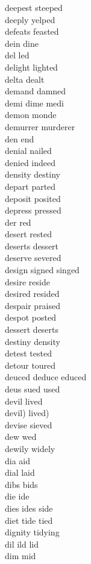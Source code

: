 deepest steeped\\
deeply yelped\\
defeats feasted\\
dein dine\\
del led\\
delight lighted\\
delta dealt\\
demand damned\\
demi dime medi\\
demon monde\\
demurrer murderer\\
den end\\
denial nailed\\
denied indeed\\
density destiny\\
depart parted\\
deposit posited\\
depress pressed\\
der red\\
desert rested\\
deserts dessert\\
deserve severed\\
design signed singed\\
desire reside\\
desired resided\\
despair praised\\
despot posted\\
dessert deserts\\
destiny density\\
detest tested\\
detour toured\\
deuced deduce educed\\
deus sued used\\
devil lived\\
devil) lived)\\
devise sieved\\
dew wed\\
dewily widely\\
dia aid\\
dial laid\\
dibs bids\\
die ide\\
dies ides side\\
diet tide tied\\
dignity tidying\\
dil ild lid\\
dim mid\\
